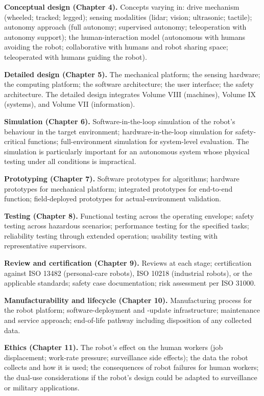 \textbf{Conceptual design (Chapter 4).} Concepts varying in: drive mechanism (wheeled; tracked; legged); sensing modalities (lidar; vision; ultrasonic; tactile); autonomy approach (full autonomy; supervised autonomy; teleoperation with autonomy support); the human-interaction model (autonomous with humans avoiding the robot; collaborative with humans and robot sharing space; teleoperated with humans guiding the robot).

\textbf{Detailed design (Chapter 5).} The mechanical platform; the sensing hardware; the computing platform; the software architecture; the user interface; the safety architecture. The detailed design integrates Volume VIII (machines), Volume IX (systems), and Volume VII (information).

\textbf{Simulation (Chapter 6).} Software-in-the-loop simulation of the robot's behaviour in the target environment; hardware-in-the-loop simulation for safety-critical functions; full-environment simulation for system-level evaluation. The simulation is particularly important for an autonomous system whose physical testing under all conditions is impractical.

\textbf{Prototyping (Chapter 7).} Software prototypes for algorithms; hardware prototypes for mechanical platform; integrated prototypes for end-to-end function; field-deployed prototypes for actual-environment validation.

\textbf{Testing (Chapter 8).} Functional testing across the operating envelope; safety testing across hazardous scenarios; performance testing for the specified tasks; reliability testing through extended operation; usability testing with representative supervisors.

\textbf{Review and certification (Chapter 9).} Reviews at each stage; certification against ISO 13482 (personal-care robots), ISO 10218 (industrial robots), or the applicable standards; safety case documentation; risk assessment per ISO 31000.

\textbf{Manufacturability and lifecycle (Chapter 10).} Manufacturing process for the robot platform; software-deployment and -update infrastructure; maintenance and service approach; end-of-life pathway including disposition of any collected data.

\textbf{Ethics (Chapter 11).} The robot's effect on the human workers (job displacement; work-rate pressure; surveillance side effects); the data the robot collects and how it is used; the consequences of robot failures for human workers; the dual-use considerations if the robot's design could be adapted to surveillance or military applications.

